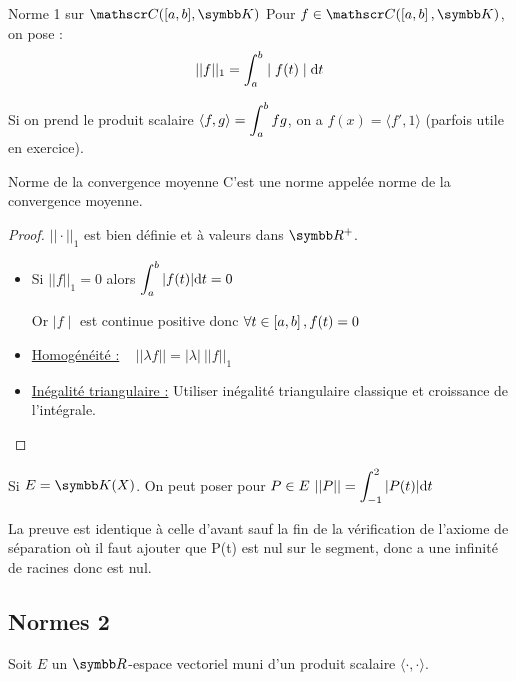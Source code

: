\begin{definition}{Norme 1 sur $\mathscr C([a, b], \K)$}{}
    Pour $f \in \mathscr C(\inter{a}{b}, \K)$, on pose :
    \[||f||_1 = \int_{a }^{b } \mid f(t) \mid \text d t\]
\end{definition}

\begin{remarque}
    Si on prend le produit scalaire $\displaystyle \langle f, g \rangle = \int_{a}^{b} fg$, on a 
    $f(x) =  \langle f', 1 \rangle $ (parfois utile en exercice). 
\end{remarque}

\begin{theoreme}{Norme de la convergence moyenne}{}
    C'est une norme appelée norme de la convergence moyenne. 
\end{theoreme}

\begin{proof}
    $||\cdot ||_1$ est bien définie et à valeurs dans $\R^+$.
    
    \begin{itemize}
        \item Si $||f||_1 = 0$ alors $\displaystyle \int_{a }^{b } |f(t)| \text d t = 0$

        Or $\mid f \mid $ est continue positive donc $\forall t \in \left[a, b\right], f(t) = 0$

        \item \uline{Homogénéité :} ~ $|| \lambda f || = |\lambda| ~ ||f||_1$ 

        \item \uline{Inégalité triangulaire :} Utiliser inégalité triangulaire classique et croissance de l'intégrale.     
    \end{itemize}
\end{proof}

\begin{exemple}
    Si $E = \K(X)$.
    On peut poser pour $\displaystyle P \in E~||P|| = \int_{-1}^{2} |P(t)| \text d t$

    La preuve est identique à celle d'avant sauf la fin de la vérification de l'axiome de séparation 
    où il faut ajouter que P(t) est nul sur le segment, donc a une infinité de racines donc
    est nul. 
\end{exemple}

\subsection{Normes 2}

Soit $E$ un $\R$-espace vectoriel muni d'un produit scalaire $\langle \cdot , \cdot \rangle$.

